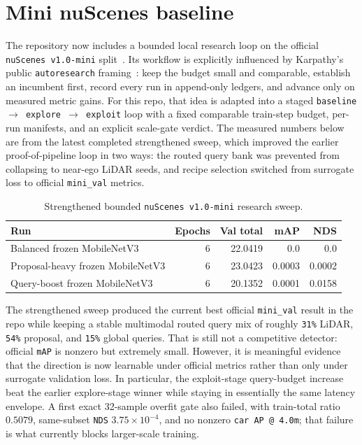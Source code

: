 \documentclass[11pt]{article}
\begin{document}
\section{Mini nuScenes baseline}
The repository now includes a bounded local research loop on the official \texttt{nuScenes v1.0-mini} split~\cite{nuscenes}. Its workflow is explicitly influenced by Karpathy's public \texttt{autoresearch} framing~\cite{repo}: keep the budget small and comparable, establish an incumbent first, record every run in append-only ledgers, and advance only on measured metric gains. For this repo, that idea is adapted into a staged \texttt{baseline $\rightarrow$ explore $\rightarrow$ exploit} loop with a fixed comparable train-step budget, per-run manifests, and an explicit scale-gate verdict. The measured numbers below are from the latest completed strengthened sweep, which improved the earlier proof-of-pipeline loop in two ways: the routed query bank was prevented from collapsing to near-ego LiDAR seeds, and recipe selection switched from surrogate loss to official \texttt{mini\_val} metrics.

\begin{table}[t]
\centering
\caption{Strengthened bounded \texttt{nuScenes v1.0-mini} research sweep.}
\label{tab:mini}
\begin{tabular}{lrrrr}
\toprule
Run & Epochs & Val total & mAP & NDS \\
\midrule
Balanced frozen MobileNetV3 & 6 & 22.0419 & 0.0 & 0.0 \\
Proposal-heavy frozen MobileNetV3 & 6 & 23.0423 & 0.0003 & 0.0002 \\
Query-boost frozen MobileNetV3 & 6 & 20.1352 & 0.0001 & 0.0158 \\
\bottomrule
\end{tabular}
\end{table}

The strengthened sweep produced the current best official \texttt{mini\_val} result in the repo while keeping a stable multimodal routed query mix of roughly \texttt{31\%} LiDAR, \texttt{54\%} proposal, and \texttt{15\%} global queries. That is still not a competitive detector: official \texttt{mAP} is nonzero but extremely small. However, it is meaningful evidence that the direction is now learnable under official metrics rather than only under surrogate validation loss. In particular, the exploit-stage query-budget increase beat the earlier explore-stage winner while staying in essentially the same latency envelope. A first exact 32-sample overfit gate also failed, with train-total ratio \(0.5079\), same-subset \texttt{NDS} \(3.75 \times 10^{-4}\), and no nonzero \texttt{car AP @ 4.0m}; that failure is what currently blocks larger-scale training.
\end{document}
